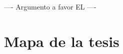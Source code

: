 %
%
%
%
%
%






----
Argumento a favor EL
----

\section{Mapa de la tesis}
\label{sec:mapadetesis}
